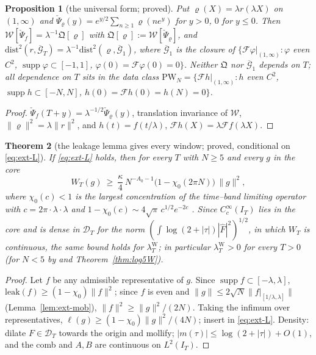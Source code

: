 \documentclass[11pt]{amsart}
\newtheorem{theorem}{Theorem}[section]
\newtheorem{proposition}[theorem]{Proposition}
\theoremstyle{definition}
\theoremstyle{remark}
\newcommand{\supp}{\operatorname{supp}}
\newcommand{\IT}{I_T}
\newcommand{\lamW}{\lambda^{\mathrm W}_T}
\newcommand{\Fh}{\widehat F}
\begin{document}
\begin{proposition}[the universal form; proved]\label{prop:ext-univ}
Put $\varrho(X)=\lambda r(\lambda X)$ on $(1,\infty)$ and $\check\Psi_\varrho(y)=e^{y/2}\sum_{n\ge1}\varrho(ne^y)$ for $y>0$, $0$ for $y\le0$.
Then $\mathcal W[\check\Psi_f]=\lambda^{-1}\mathfrak Q[\varrho]$ with $\mathfrak Q[\varrho]:=\mathcal W[\check\Psi_\varrho]$, and
$\mathrm{dist}^2(r,\overline{\mathcal G}_T)=\lambda^{-1}\mathrm{dist}^2(\varrho,\overline{\mathcal G}_1)$, where $\overline{\mathcal G}_1$ is the
closure of $\{\mathcal F\varphi|_{(1,\infty)}:\varphi$ even $C^2$, $\supp\varphi\subset[-1,1]$, $\varphi(0)=\mathcal F\varphi(0)=0\}$. Neither
$\mathfrak Q$ nor $\overline{\mathcal G}_1$ depends on $T$; all dependence on $T$ sits in the data class
$\mathrm{PW}_N=\{\mathcal Fh|_{(1,\infty)}:h$ even $C^2$, $\supp h\subset[-N,N]$, $h(0)=\mathcal Fh(0)=h(N)=0\}$.
\end{proposition}
\begin{proof}
$\check\Psi_f(T+y)=\lambda^{-1/2}\check\Psi_\varrho(y)$, translation invariance of $\mathcal W$, $\|\varrho\|^2=\lambda\|r\|^2$, and
$h(t)=f(t/\lambda)$, $\mathcal Fh(X)=\lambda\mathcal Ff(\lambda X)$.
\end{proof}

\begin{theorem}[the leakage lemma gives every window; proved, conditional on \eqref{eq:ext-L}]\label{thm:ext-margin}
If \eqref{eq:ext-L} holds, then for every $T$ with $N\ge5$ and every $g$ in the core
\[
W_T(g)\ \ge\ \frac{\kappa}{4}\,N^{-A_0-1}\big(1-\chi_0(2\pi N)\big)\,\|g\|^2,
\]
where $\chi_0(c)<1$ is the largest concentration of the time--band limiting operator with $c=2\pi\cdot\lambda\cdot\lambda$ and
$1-\chi_0(c)\sim4\sqrt\pi\,c^{1/2}e^{-2c}$ \cite{SlepianPollak1961,Fuchs1964}. Since $C_c^\infty(\IT)$ lies in the core and is
dense in $\mathcal D_T$ for the norm $(\int\log(2+|\tau|)|\Fh|^2)^{1/2}$, in which $W_T$ is continuous, the same bound holds for
$\lamW$; in particular $\lamW>0$ for every $T>0$ (for $N<5$ by \cite{Zhu2026} and Theorem~\ref{thm:log5W}).
\end{theorem}
\begin{proof}
Let $f$ be any admissible representative of $g$. Since $\supp f\subset[-\lambda,\lambda]$, $\mathrm{leak}(f)\ge(1-\chi_0)\|f\|^2$; since
$f$ is even and $\|g\|\le2\sqrt N\|f|_{[1/\lambda,\lambda]}\|$ (Lemma~\ref{lem:ext-mob}), $\|f\|^2\ge\|g\|^2/(2N)$. Taking the
infimum over representatives, $\ell(g)\ge(1-\chi_0)\|g\|^2/(4N)$; insert in \eqref{eq:ext-L}. Density: dilate $F\in\mathcal D_T$
towards the origin and mollify; $|m(\tau)|\le\log(2+|\tau|)+O(1)$, and the comb and $A,B$ are continuous on $L^2(\IT)$.
\end{proof}
\end{document}
